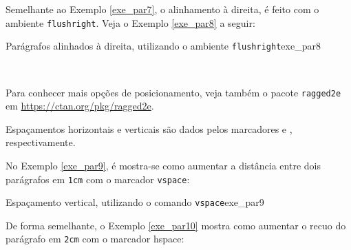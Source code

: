 Semelhante ao Exemplo \ref{exe_par7}, o alinhamento à direita, é feito com o ambiente {\tt flushright}. Veja o Exemplo \ref{exe_par8} a seguir:

\begin{texexptitled}[breakable,enhanced,middle=2mm]{Parágrafos alinhados à direita, utilizando o ambiente  {\tt flushright}}{exe_par8}
\begin{flushright}
\lipsumsentence[21-22] \\ 
\lipsumsentence[23-24]
\end{flushright}
\end{texexptitled}



\begin{marker}
Para conhecer mais opções de posicionamento, veja também o pacote {\tt ragged2e} em \url{https://ctan.org/pkg/ragged2e}.
\end{marker}

Espaçamentos horizontais e verticais são dados pelos marcadores \texttt{\vspace{}} e \texttt{\hspace{}}, respectivamente.


No Exemplo \ref{exe_par9}, é mostra-se como aumentar a distância entre dois parágrafos em {\tt 1cm} com o marcador {\tt vspace}:

\begin{texexptitled}[breakable,enhanced,middle=2mm]{Espaçamento vertical, utilizando o comando {\tt vspace}}{exe_par9}
\lipsumsentence[32-33] 
\vspace{1cm}
\lipsumsentence[34-35]
\end{texexptitled}

De forma semelhante, o Exemplo \ref{exe_par10} mostra como aumentar o recuo do parágrafo em {\tt 2cm} com o marcador {hspace}:

